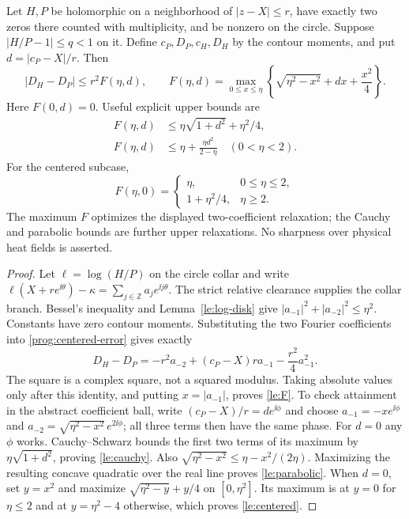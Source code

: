 \begin{theorem}\label{le:gap-bound}
Let $H,P$ be holomorphic on a neighborhood of $|z-X|\le r$, have
exactly two zeros there counted with multiplicity, and be nonzero on
the circle. Suppose $|H/P-1|\le q<1$ on it. Define $c_P,D_P,c_H,D_H$
by the contour moments, and put $d=|c_P-X|/r$. Then
\begin{equation}
 |D_H-D_P|\le r^2 F(\eta,d),\qquad
 F(\eta,d)=\max_{0\le x\le\eta}
       \left\{\sqrt{\eta^2-x^2}+dx+\frac{x^2}{4}\right\}.
 \label{le:F}
\end{equation}
Here $F(0,d)=0$. Useful explicit upper bounds are
\begin{align}
 F(\eta,d)&\le\eta\sqrt{1+d^2}+\eta^2/4,
                                                        \label{le:cauchy}\\
 F(\eta,d)&\le\eta+\frac{\eta d^2}{2-\eta}\quad(0<\eta<2).
                                                        \label{le:parabolic}
\end{align}
For the centered subcase,
\begin{equation}
 F(\eta,0)=
 \begin{cases}\eta,&0\le\eta\le2,\\1+\eta^2/4,&\eta\ge2.
 \end{cases}
 \label{le:centered}
\end{equation}
The maximum $F$ optimizes the displayed two-coefficient relaxation;
the Cauchy and parabolic bounds are further upper relaxations. No
sharpness over physical heat fields is asserted.
\end{theorem}
\begin{proof}
Let $\ell=\log(H/P)$ on the circle collar and write
$\ell(X+re^{\ii\theta})-\kappa=\sum_{j\in\mathbb Z}a_j e^{\ii j\theta}$.
The strict relative clearance supplies the collar branch. Bessel's
inequality and Lemma~\ref{le:log-disk} give
$|a_{-1}|^2+|a_{-2}|^2\le\eta^2$. Constants have zero contour moments.
Substituting the two Fourier coefficients into
\eqref{prog:centered-error} gives exactly
\begin{equation}
 D_H-D_P=-r^2a_{-2}+(c_P-X)r a_{-1}-\frac{r^2}{4}a_{-1}^2.
 \label{le:two-modes}
\end{equation}
The square is a complex square, not a squared modulus. Taking absolute
values only after this identity, and putting $x=|a_{-1}|$, proves
\eqref{le:F}. To check attainment in the abstract coefficient ball,
write $(c_P-X)/r=de^{\ii\phi}$ and choose
$a_{-1}=-xe^{\ii\phi}$ and
$a_{-2}=\sqrt{\eta^2-x^2}\,e^{2\ii\phi}$; all three terms then
have the same phase. For $d=0$ any $\phi$ works.
Cauchy--Schwarz bounds the first two terms of its maximum
by $\eta\sqrt{1+d^2}$, proving \eqref{le:cauchy}.
Also $\sqrt{\eta^2-x^2}\le\eta-x^2/(2\eta)$.
Maximizing the resulting concave quadratic over the real line proves
\eqref{le:parabolic}. When $d=0$, set $y=x^2$ and maximize
$\sqrt{\eta^2-y}+y/4$ on $[0,\eta^2]$.
Its maximum is at $y=0$ for $\eta\le2$ and at $y=\eta^2-4$ otherwise,
which proves \eqref{le:centered}.
\end{proof}

